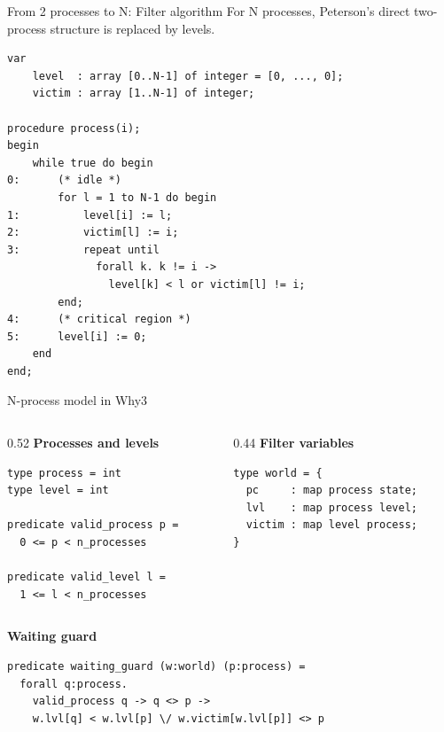 \documentclass[aspectratio=169,10pt]{beamer}
\begin{document}
\begin{frame}[fragile]{From 2 processes to N: Filter algorithm}
\vspace{0.2cm}
For N processes, Peterson's direct two-process structure is replaced by levels.
\vspace{0.1cm}

\begin{lstlisting}[basicstyle=\ttfamily\footnotesize]
var
    level  : array [0..N-1] of integer = [0, ..., 0];
    victim : array [1..N-1] of integer;

procedure process(i);
begin
    while true do begin
0:      (* idle *)
        for l = 1 to N-1 do begin
1:          level[i] := l;
2:          victim[l] := i;
3:          repeat until
              forall k. k != i ->
                level[k] < l or victim[l] != i;
        end;
4:      (* critical region *)
5:      level[i] := 0;
    end
end;
\end{lstlisting}
\end{frame}

\begin{frame}[fragile]{N-process model in Why3}
\begin{columns}[T]
\begin{column}{0.52\textwidth}
\textbf{Processes and levels}
\begin{lstlisting}[language=why3]
type process = int
type level = int

predicate valid_process p =
  0 <= p < n_processes

predicate valid_level l =
  1 <= l < n_processes
\end{lstlisting}
\end{column}
\begin{column}{0.44\textwidth}
\textbf{Filter variables}
\begin{lstlisting}[language=why3]
type world = {
  pc     : map process state;
  lvl    : map process level;
  victim : map level process;
}
\end{lstlisting}
\end{column}
\end{columns}

\vspace{0.25cm}
\textbf{Waiting guard}
\begin{lstlisting}[language=why3]
predicate waiting_guard (w:world) (p:process) =
  forall q:process.
    valid_process q -> q <> p ->
    w.lvl[q] < w.lvl[p] \/ w.victim[w.lvl[p]] <> p
\end{lstlisting}
\end{frame}
\end{document}
